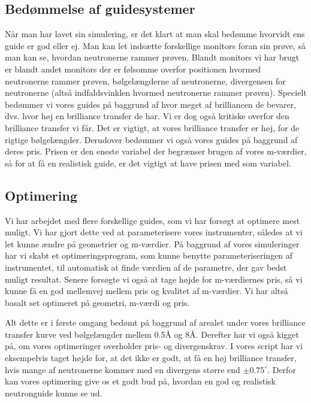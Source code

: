 \documentclass[12pt,oneside,a4paper]{article}
\begin{document}
{{{{{\subsection{Bedømmelse af guidesystemer}

Når man har lavet sin simulering, er det klart at man skal bedømme hvorvidt ens guide er god eller ej. Man kan let indsætte forskellige monitors foran sin prøve, så man kan se, hvordan neutronerne rammer prøven. Blandt monitors vi har brugt er blandt andet monitors der er følsomme overfor positionen hvormed neutronerne rammer prøven, bølgelængderne af neutronerne, divergensen for neutronerne (altså indfaldsvinklen hvormed neutronerne rammer prøven). Specielt bedømmer vi vores guides på baggrund af hvor meget af brilliancen de bevarer, dvs. hvor høj en brilliance transfer de har. Vi er dog også kritiske overfor den brilliance transfer vi får. Det er vigtigt, at vores brilliance transfer er høj, for de rigtige bølgelængder. Derudover bedømmer vi også vores guides på baggrund af deres pris. Prisen er den eneste variabel der begrænser brugen af vores m-værdier, så for at få en realistisk guide, er det vigtigt at have prisen med som variabel.


\subsection{Optimering}
Vi har arbejdet med flere forskellige guides, som vi har forsøgt at optimere mest muligt. Vi har gjort dette ved at parameterisere vores instrumenter, således at vi let kunne ændre på geometrier og m-værdier. På baggrund af vores simuleringer har vi skabt et optimeringsprogram, som kunne benytte parameteriseringen af instrumentet, til automatisk at finde værdien af de parametre, der gav bedst muligt resultat.
Senere forsøgte vi også at tage højde for m-værdiernes pris, så vi kunne få en god mellemvej mellem pris og kvalitet af m-værdier. Vi har altså basalt set optimeret på geometri, m-værdi og pris. 

Alt dette er i første omgang bedømt på baggrund af arealet under vores brilliance transfer kurve ved bølgelængder mellem 0.5Å og 8Å. Derefter har vi også kigget på, om vores optimeringer overholder pris- og divergenskrav. I vores script har vi eksempelvis taget højde for, at det ikke er godt, at få en høj brilliance transfer, hvis mange af neutronerne kommer med en divergens større end $\pm0.75^\circ$. Derfor kan vores optimering give os et godt bud på, hvordan en god og realistisk neutronguide kunne se ud. 


}}}}}
\end{document}
